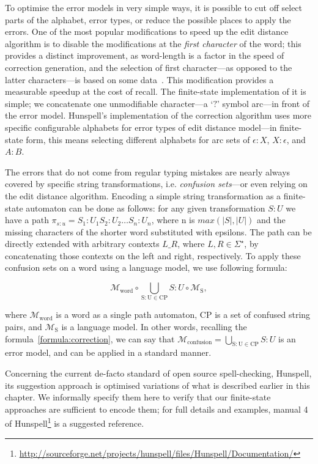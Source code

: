 \documentclass[a4paper,12pt]{article}
\begin{document}
To optimise the error models in very simple ways, it is possible to cut off select parts
of the alphabet, error types, or reduce the possible places to apply the
errors. One of the most popular modifications to speed up the edit distance
algorithm is to disable the modifications at the \emph{first character} of the
word; this provides a distinct improvement, as word-length is a factor in the
speed of correction generation, and the selection of first character---as
opposed to the latter characters---is based on some
data~\cite[]{bhagat2007spelling}. This modification provides a
measurable speedup at the cost of recall. The finite-state implementation of it
is simple; we concatenate one unmodifiable character---a `$?$' symbol arc---in
front of the error model. Hunspell's implementation of the correction
algorithm uses more specific configurable alphabets for error types of edit
distance model---in finite-state form, this means selecting different alphabets
for arc sets of $\epsilon:X$, $X:\epsilon$, and $A:B$.

The errors that do not come from regular typing mistakes are nearly always
covered by specific string transformations, i.e. \emph{confusion sets}---or
even relying on the edit distance algorithm. Encoding a simple string
transformation as a finite-state automaton can be done as follows: for any
given transformation $S:U$ we have a path $\pi_{s:u} = S_1:U_1 S_2:U_2 \ldots
S_n:U_n$, where n is $max(|S|, |U|)$ and the missing characters of the shorter
word substituted with epsilons. The path can be directly extended with
arbitrary contexts $L \_ R$, where $L, R \in \Sigma^{\star}$, by concatenating
those contexts on the left and right, respectively. To apply these confusion sets
on a word using a language model, we use following formula:

\begin{equation}
\mathcal{M}_{\mathrm{word}} \circ \bigcup_{\mathrm{S:U} \in \mathrm{CP}} S:U \circ \mathcal{M}_{\mathrm{S}},
\end{equation}

where $\mathcal{M}_{\mathrm{word}}$ is a word as a single path automaton,
$\mathrm{CP}$ is a set of confused string pairs, and
$\mathcal{M}_{\mathrm{S}}$ is a language model. In other words, recalling the
formula~\ref{formula:correction}, we can say that
$\mathcal{M}_{\mathrm{confusion}} = \bigcup_{\mathrm{S:U} \in \mathrm{CP}} S:U$
is an error model, and can be applied in a standard manner.

Concerning the current de-facto standard of open source spell-checking,
Hunspell, its suggestion approach is optimised variations of what is
described earlier in this chapter. We informally specify them here to
verify that our finite-state approaches are sufficient to encode
them; for full details and examples, manual 4 of
Hunspell\footnote{\url{http://sourceforge.net/projects/hunspell/files/Hunspell/Documentation/}} is a suggested reference.
\end{document}
